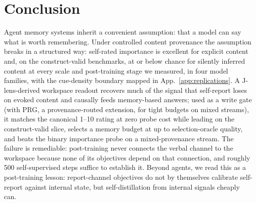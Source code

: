 \section{Conclusion}
\label{sec:conclusion}

Agent memory systems inherit a convenient assumption: that a model can say what is
worth remembering. Under controlled content provenance the assumption breaks in a structured
way: self-rated importance is excellent for explicit content and, on the
construct-valid benchmarks, at or below chance for silently inferred content
at every scale and post-training stage we measured, in four model families,
with the cue-density boundary mapped in App.~\ref{app:replications}. A J-lens-derived
workspace readout recovers much of the signal that self-report loses on evoked
content and causally feeds memory-based answers; used as a write gate (with
PRG, a provenance-routed extension, for tight budgets on mixed streams), it
matches the canonical 1--10 rating at zero probe cost while leading on the
construct-valid slice, selects a memory budget at up to selection-oracle
quality, and beats the binary importance probe on a mixed-provenance
stream. The failure is remediable: post-training never connects the verbal channel to
the workspace because none of its objectives depend on that connection, and
roughly 500 self-supervised steps suffice to establish it. Beyond agents, we read this as a post-training lesson: report-channel objectives
do not by themselves calibrate self-report against internal state, but
self-distillation from internal signals cheaply can.

